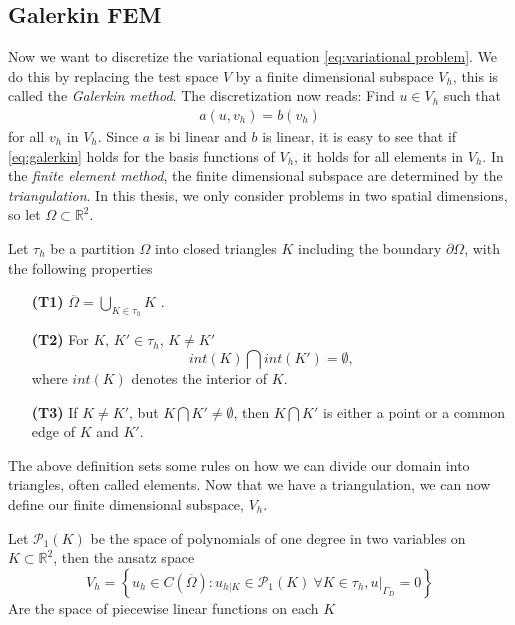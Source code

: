 \documentclass[../Main/main.tex]{subfiles}
\begin{document}
	\subsection*{Galerkin FEM} \label{galerkin_fem}
	Now we want to discretize the variational equation \eqref{eq:variational problem}. We do this by replacing the test space $V$ by a finite dimensional subspace $V_h$, this is called the \emph{Galerkin method}. The discretization now reads: Find $u \in V_h$ such that 
	\begin{equation}\label{eq:galerkin}
		\begin{gathered}
			a(u,v_h) = b(v_h) 
		\end{gathered}
	\end{equation}
	for all $v_h$ in $V_h$.
	Since $a$ is bi linear and $b$ is linear, it is easy to see that if \eqref{eq:galerkin} holds for the basis functions of $V_h$, it holds for all elements in $V_h$. In the \emph{finite element method}, the finite dimensional subspace are determined by the \emph{triangulation}. In this thesis, we only consider problems in two spatial dimensions, so let $\Omega \subset \mathbb{R}^2$. 
	\begin{definition}
		Let $\tau_h$ be a partition $\Omega$ into closed triangles $K$ including the boundary $\partial \Omega$, with the following properties
		\begin{itemize}
			\item[\textbf{(T1)}] $\overline{\Omega} = \bigcup_{K\in \tau_h}K$ .
			\item[\textbf{(T2)}] For $K$, $K' \in \tau_h$, $K \neq K'$ \begin{equation*}
				int(K) \bigcap int(K')=\emptyset,
			\end{equation*} 
			where $int(K)$ denotes the interior of $K$.
			\item[\textbf{(T3)}] If $K\neq K'$, but $K\bigcap K' \neq \emptyset$, then $K\bigcap K'$ is either a point or a common edge of $K$ and $K'$.
			
		\end{itemize}
	\end{definition}
	The above definition sets some rules on how we can divide our domain into triangles, often called elements.
	Now that we have a triangulation, we can now define our finite dimensional subspace, $V_h$.
	\begin{definition}\label{def:linear ansatz}
		Let $\mathcal{P}_1(K)$ be the space of polynomials of one degree in two variables on $K\subset \mathbb{R}^2$, then the ansatz space
		\begin{equation*}
			V_h = \left \{ u_h \in C(\overline{\Omega}) : u_{h|K} \in \mathcal{P}_1(K) \ \forall K \in \tau_h, u|_{\Gamma_D} = 0  \right \}
		\end{equation*}
		Are the space of piecewise linear functions on each $K$
	\end{definition}
\end{document}
